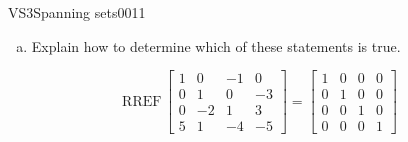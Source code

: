\begin{exercise}{VS3}{Spanning sets}{0011}
\begin{exerciseStatement}
\begin{enumerate}[(a)]
\begin{itemize}
 The set of vectors \(\left\{ \left[\begin{array}{c}
1 \\
0 \\
0 \\
5
\end{array}\right] , \left[\begin{array}{c}
0 \\
1 \\
-2 \\
1
\end{array}\right] , \left[\begin{array}{c}
-1 \\
0 \\
1 \\
-4
\end{array}\right] , \left[\begin{array}{c}
0 \\
-3 \\
3 \\
-5
\end{array}\right] \right\}\) does \textbf{not} span \(\mathbb R^4\). 

 
\end{itemize}

     
\item  

 Explain how to determine which of these statements is true. 

 
\end{enumerate}

     \end{exerciseStatement}
 \begin{exerciseAnswer} 

 \[
\mathrm{RREF}\, \left[\begin{array}{cccc}
1 & 0 & -1 & 0 \\
0 & 1 & 0 & -3 \\
0 & -2 & 1 & 3 \\
5 & 1 & -4 & -5
\end{array}\right] = \left[\begin{array}{cccc}
1 & 0 & 0 & 0 \\
0 & 1 & 0 & 0 \\
0 & 0 & 1 & 0 \\
0 & 0 & 0 & 1
\end{array}\right]
            \] 

 


\end{exerciseAnswer}
\end{exercise}
